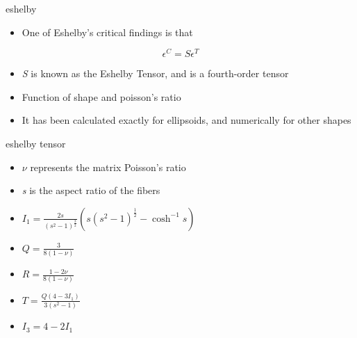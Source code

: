 \documentclass[
  letterpaper,
  ignorenonframetext,
  aspectratio=43,
  handout,
  12pt]{beamer}
\providecommand{\tightlist}{%
  \setlength{\itemsep}{0pt}\setlength{\parskip}{0pt}}
\providecommand{\tightlist}{%
\setlength{\itemsep}{0pt}\setlength{\parskip}{0pt}}
\begin{document}
\begin{frame}{eshelby}
\protect\hypertarget{eshelby-2}{}
\begin{itemize}
\tightlist
\item
  One of Eshelby's critical findings is that
\end{itemize}

\[\epsilon^C = S \epsilon^T\]

\begin{itemize}
\tightlist
\item
  \emph{S} is known as the Eshelby Tensor, and is a fourth-order tensor
\item
  Function of shape and poisson's ratio
\item
  It has been calculated exactly for ellipsoids, and numerically for
  other shapes
\end{itemize}
\end{frame}

\begin{frame}{eshelby tensor}
\protect\hypertarget{eshelby-tensor}{}
\begin{itemize}
\tightlist
\item
  \(\nu\) represents the matrix Poisson's ratio
\item
  \emph{s} is the aspect ratio of the fibers
\item
  \(I_1 = \frac{2s}{\left(s^2-1\right)^{\frac{3}{2}}}(s{\left(s^2-1\right)}^{\frac{1}{2}}-\cosh^{-1} s)\)
\item
  \(Q=\frac{3}{8(1-\nu)}\)
\item
  \(R=\frac{1-2\nu}{8(1-\nu)}\)
\item
  \(T=\frac{Q\left(4-3I_1\right)}{3(s^2-1)}\)
\item
  \(I_3 = 4-2I_1\)
\end{itemize}
\end{frame}
\end{document}
